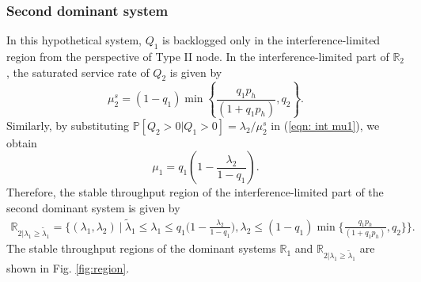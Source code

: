 \documentclass[draftcls,12pt,onecolumn]{IEEEtran}
\begin{document}
\subsubsection{Second dominant system}
\indent In this hypothetical system, $Q_1$ is backlogged only in the interference-limited region from the perspective of Type II node. In the interference-limited part of $\mathbb{R}_{2}$, the saturated service rate of $Q_2$ is given by 
\begin{equation}
\mu_2^s= (1-q_1) \min \left\lbrace \frac{q_1 p_h}{ (1+ q_1 p_h)}, q_2 \right\rbrace.
\end{equation}
Similarly, by substituting $\mathbb{P}[Q_2 >0 | Q_1 >0] =\lambda_2 / \mu_2^s$ in (\ref{eqn: int mu1}), we obtain 
\begin{equation}\label{eqn: mu1 2nd dom}
\mu_1= q_1 \left( 1- \frac{\lambda_2}{1-q_1}\right). 
\end{equation}
Therefore, the stable throughput region of the interference-limited part of the second dominant system is given by 
\begin{align}
\mathbb{R}_{2 |  \lambda_1 \geq \tilde{\lambda}_1 } = \big\{   (\lambda_1, \lambda_2) \ | \  \tilde{\lambda}_1  \leq \lambda_1 \leq  q_1 \big( 1- \frac{\lambda_2}{1-q_1}\big), \lambda_2 \leq  (1-q_1) \min \big\lbrace \frac{q_1 p_h}{ (1+ q_1 p_h)}, q_2 \big\rbrace  \big\}.  
\end{align}
The stable throughput regions of the dominant systems $\mathbb{R}_1$ and $\mathbb{R}_{2 |  \lambda_1 \geq \tilde{\lambda}_1 }$ are shown in Fig. \ref{fig:region}. 
\end{document}
